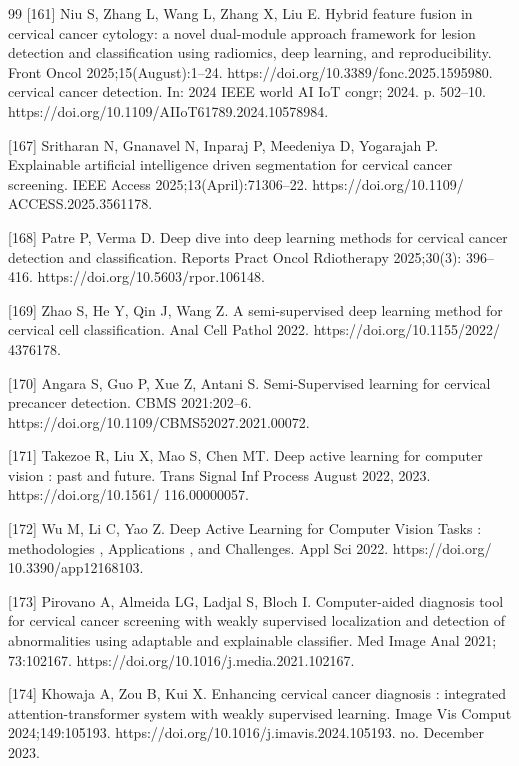 \documentclass[final,5p,times,twocolumn,authoryear]{elsarticle}
\begin{document}
\begin{thebibliography}{99}
[161] Niu S, Zhang L, Wang L, Zhang X, Liu E. Hybrid feature fusion in cervical cancer cytology: a novel dual-module approach framework for lesion detection and classification using radiomics, deep learning, and reproducibility. Front Oncol 2025;15(August):1–24. https://doi.org/10.3389/fonc.2025.1595980. cervical cancer detection. In: 2024 IEEE world AI IoT congr; 2024. p. 502–10. https://doi.org/10.1109/AIIoT61789.2024.10578984.

[167] Sritharan N, Gnanavel N, Inparaj P, Meedeniya D, Yogarajah P. Explainable artificial intelligence driven segmentation for cervical cancer screening. IEEE Access 2025;13(April):71306–22. https://doi.org/10.1109/ ACCESS.2025.3561178.

[168] Patre P, Verma D. Deep dive into deep learning methods for cervical cancer detection and classification. Reports Pract Oncol Rdiotherapy 2025;30(3): 396–416. https://doi.org/10.5603/rpor.106148.

[169] Zhao S, He Y, Qin J, Wang Z. A semi-supervised deep learning method for cervical cell classification. Anal Cell Pathol 2022. https://doi.org/10.1155/2022/ 4376178.

[170] Angara S, Guo P, Xue Z, Antani S. Semi-Supervised learning for cervical precancer detection. CBMS 2021:202–6. https://doi.org/10.1109/CBMS52027.2021.00072.

[171] Takezoe R, Liu X, Mao S, Chen MT. Deep active learning for computer vision : past and future. Trans Signal Inf Process August 2022, 2023. https://doi.org/10.1561/ 116.00000057.

[172] Wu M, Li C, Yao Z. Deep Active Learning for Computer Vision Tasks : methodologies , Applications , and Challenges. Appl Sci 2022. https://doi.org/ 10.3390/app12168103.

[173] Pirovano A, Almeida LG, Ladjal S, Bloch I. Computer-aided diagnosis tool for cervical cancer screening with weakly supervised localization and detection of abnormalities using adaptable and explainable classifier. Med Image Anal 2021; 73:102167. https://doi.org/10.1016/j.media.2021.102167.

 [174] Khowaja A, Zou B, Kui X. Enhancing cervical cancer diagnosis : integrated attention-transformer system with weakly supervised learning. Image Vis Comput 2024;149:105193. https://doi.org/10.1016/j.imavis.2024.105193. no. December 2023.


\end{thebibliography}
\end{document}

